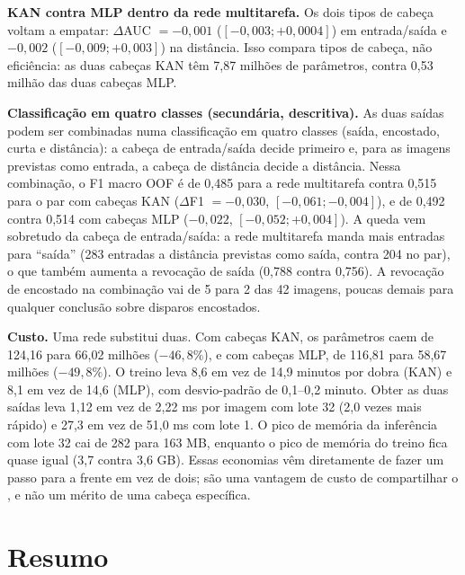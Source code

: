 

\textbf{KAN contra MLP dentro da rede multitarefa.} Os dois tipos de cabeça voltam a empatar: $\Delta$AUC $= -0{,}001$ ($[-0{,}003; +0{,}0004]$) em entrada/saída e $-0{,}002$ ($[-0{,}009; +0{,}003]$) na distância. Isso compara tipos de cabeça, não eficiência: as duas cabeças KAN têm 7,87 milhões de parâmetros, contra 0,53 milhão das duas cabeças MLP.

\textbf{Classificação em quatro classes (secundária, descritiva).} As duas saídas podem ser combinadas numa classificação em quatro classes (saída, encostado, curta e distância): a cabeça de entrada/saída decide primeiro e, para as imagens previstas como entrada, a cabeça de distância decide a distância. Nessa combinação, o F1 macro OOF é de 0,485 para a rede multitarefa contra 0,515 para o par com cabeças KAN ($\Delta$F1 $= -0{,}030$, $[-0{,}061; -0{,}004]$), e de 0,492 contra 0,514 com cabeças MLP ($-0{,}022$, $[-0{,}052; +0{,}004]$). A queda vem sobretudo da cabeça de entrada/saída: a rede multitarefa manda mais entradas para ``saída'' (283 entradas a distância previstas como saída, contra 204 no par), o que também aumenta a revocação de saída (0,788 contra 0,756). A revocação de encostado na combinação vai de 5 para 2 das 42 imagens, poucas demais para qualquer conclusão sobre disparos encostados.



\textbf{Custo.} Uma rede substitui duas. Com cabeças KAN, os parâmetros caem de 124,16 para 66,02 milhões ($-46{,}8\%$), e com cabeças MLP, de 116,81 para 58,67 milhões ($-49{,}8\%$). O treino leva 8,6 em vez de 14,9 minutos por dobra (KAN) e 8,1 em vez de 14,6 (MLP), com desvio-padrão de 0,1--0,2 minuto. Obter as duas saídas leva 1,12 em vez de 2,22 ms por imagem com lote 32 (2,0 vezes mais rápido) e 27,3 em vez de 51,0 ms com lote 1. O pico de memória da inferência com lote 32 cai de 282 para 163 MB, enquanto o pico de memória do treino fica quase igual (3,7 contra 3,6 GB). Essas economias vêm diretamente de fazer um passo para a frente em vez de dois; são uma vantagem de custo de compartilhar o , e não um mérito de uma cabeça específica.

\section{Resumo}
\label{sec:results_summary}

